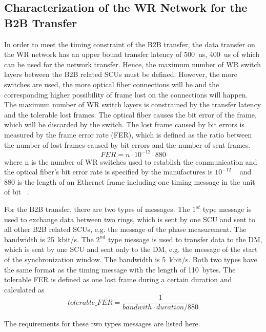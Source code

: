\subsection{Characterization of the WR Network for the B2B Transfer}
In order to meet the timing constraint of the B2B transfer, the data transfer on the WR network has an upper bound transfer latency of \SI{500}{us}, \SI{400}{us} of which can be used for the network transfer. Hence, the maximum number of WR switch layers between the B2B related SCUs must be defined. However, the more switches are used, the more optical fiber connections will be and the corresponding higher possibility of frame lost on the connections will happen. The maximum number of WR switch layers is constrained by the transfer latency and the tolerable lost frames. The optical fiber causes the bit error of the frame, which will be discarded by the switch. The lost frame caused by bit errors is measured by the frame error rate (FER), which is defined as the ratio between the number of lost frames caused by bit errors and the number of sent frames. 
\begin{equation}
\label{FER}
	FER=n\cdot10^{-12}\cdot880
\end{equation}
where n is the number of WR switches used to establish the communication and the optical fiber's bit error rate is specified by the manufactures is $10^{-12}$ ~\cite{noauthor_datasheet_nodate} and 880 is the length of an Ethernet frame including one timing message in the unit of bit ~\cite{beck_timing_2015}.  

For the B2B transfer, there are two types of messages. The $1^\mathit{st}$ type message is used to exchange data between two rings, which is sent by one SCU and sent to all other B2B related SCUs, e.g. the message of the phase measurement. The bandwidth is \SI{25}{kbit/s}. The $2^\mathit{nd}$ type message is used to transfer data to the DM, which is sent by one SCU and sent only to the DM, e.g. the message of the start of the synchronization window. The bandwidth is \SI{5}{kbit/s}. Both two types have the same format as the timing message with the length of \SI{110}{bytes}. The tolerable FER is defined as one lost frame during a certain duration and calculated as 
\begin{equation}
	tolerable\_FER=\frac{1}{bandwith\cdot duration/880}
\end{equation}

The requirements for these two types messages are listed here.

